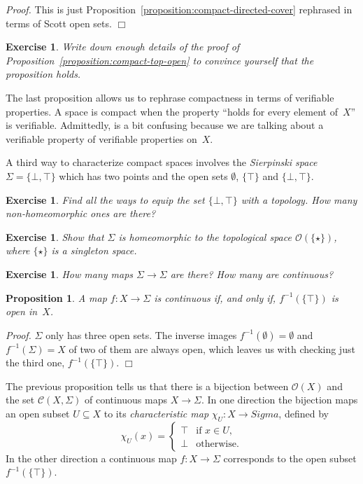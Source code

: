 \documentclass[a4paper,10pt]{article}
\newtheorem{proposition}[theorem]{Proposition}
\newtheorem{exercise}[theorem]{Exercise}
\newenvironment{proof}{\par\noindent\textit{Proof.}}{\hfill$\Box$\par\medskip}
\newcommand{\set}[1]{\{#1\}}
\newcommand{\tpl}[1]{\mathcal{O}(#1)}
\newcommand{\cont}[1]{\mathcal{C}(#1)}
\begin{document}
\begin{proof}
  This is just Proposition~\ref{proposition:compact-directed-cover}
  rephrased in terms of Scott open sets.
\end{proof}

\begin{exercise}
  Write down enough details of the proof of
  Proposition~\ref{proposition:compact-top-open} to convince yourself
  that the proposition holds.
\end{exercise}

The last proposition allows us to rephrase compactness in terms of
verifiable properties. A space is compact when the property ``holds
for every element of~$X$'' is verifiable. Admittedly, is a bit
confusing because we are talking about a verifiable property of
verifiable properties on~$X$.

A third way to characterize compact spaces involves the
\emph{Sierpinski space} $\Sigma = \set{\bot, \top}$ which has two
points and the open sets $\emptyset$, $\set{\top}$ and $\set{\bot,
  \top}$.

\begin{exercise}
  Find all the ways to equip the set $\set{\bot, \top}$ with a
  topology. How many non-homeomorphic ones are there?
\end{exercise}

\begin{exercise}
  Show that $\Sigma$ is homeomorphic to the topological space
  $\tpl{\set{\star}}$, where $\set{\star}$ is a singleton space.
\end{exercise}

\begin{exercise}
  How many maps $\Sigma \to \Sigma$ are there? How many are continuous?
\end{exercise}

\begin{proposition}
  \label{proposition:map-sigma-continuous}
  A map $f : X \to \Sigma$ is continuous if, and only if,
  $f^{-1}(\set{\top})$ is open in~$X$.
\end{proposition}

\begin{proof}
  $\Sigma$ only has three open sets. The inverse images
  $f^{-1}(\emptyset) = \emptyset$ and $f^{-1}(\Sigma) = X$ of two of
  them are always open, which leaves us with checking just the third
  one, $f^{-1}(\set{\top})$.
\end{proof}

The previous proposition tells us that there is a bijection between
$\tpl{X}$ and the set $\cont{X,\Sigma}$ of continuous maps $X \to
\Sigma$. In one direction the bijection maps an open subset $U
\subseteq X$ to its \emph{characteristic map} $\chi_U : X \to Sigma$,
defined by
%
\begin{equation*}
  \chi_U(x) =
  \begin{cases}
    \top & \text{if $x \in U$,}\\
    \bot & \text{otherwise.}
  \end{cases}  
\end{equation*}
%
In the other direction a continuous map $f : X \to \Sigma$ corresponds
to the open subset $f^{-1}(\set{\top})$.
\end{document}
